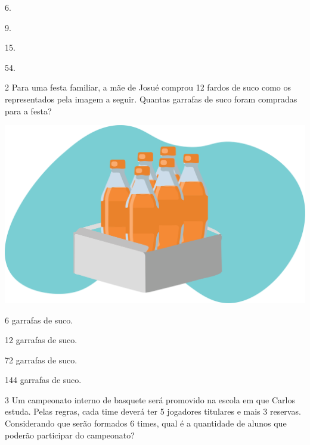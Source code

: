 \begin{escolha}
    \item 6.
    \item 9.
    \item 15.
    \item 54.
\end{escolha}

\pagebreak

\num{2} Para uma festa familiar, a mãe de Josué comprou 12 fardos de
suco como os representados pela imagem a seguir. Quantas garrafas de suco foram compradas para a festa? 

\begin{minipage}{.5\textwidth}
\includegraphics[width=\textwidth]{./media/image26.png}
\end{minipage}
\begin{minipage}{.5\textwidth}
\begin{escolha}
\item
  6 garrafas de suco.
\item
  12 garrafas de suco.
\item
  72 garrafas de suco.
\item
  144 garrafas de suco.
\end{escolha}
\end{minipage}

\num{3} Um campeonato interno de basquete será promovido na escola em que Carlos
estuda. Pelas regras, cada time deverá ter 5 jogadores titulares e mais 3 reservas. Considerando que serão formados 6 times, qual é a quantidade de alunos que poderão participar do campeonato?

